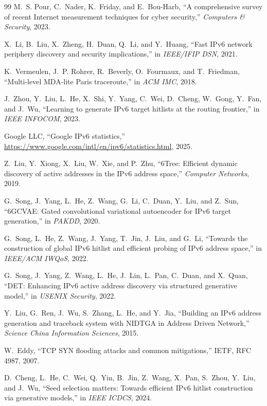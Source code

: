 \documentclass[conference]{IEEEtran}
\begin{document}
\begin{thebibliography}{99}
M.~S. Pour, C.~Nader, K.~Friday, and E.~Bou-Harb,
``A comprehensive survey of recent Internet measurement techniques
for cyber security,''
\emph{Computers \& Security}, 2023.

X.~Li, B.~Liu, X.~Zheng, H.~Duan, Q.~Li, and Y.~Huang,
``Fast IPv6 network periphery discovery and security implications,''
in \emph{IEEE/IFIP DSN}, 2021.

K.~Vermeulen, J.~P. Rohrer, R.~Beverly, O.~Fourmaux, and T.~Friedman,
``Multi-level MDA-lite Paris traceroute,''
in \emph{ACM IMC}, 2018.

J.~Zhou, Y.~Liu, L.~He, X.~Shi, Y.~Yang, C.~Wei, D.~Cheng, W.~Gong,
Y.~Fan, and J.~Wu,
``Learning to generate IPv6 target hitlists at the routing frontier,''
in \emph{IEEE INFOCOM}, 2023.

Google LLC,
``Google IPv6 statistics,''
\url{https://www.google.com/intl/en/ipv6/statistics.html}, 2025.

Z.~Liu, Y.~Xiong, X.~Liu, W.~Xie, and P.~Zhu,
``6Tree: Efficient dynamic discovery of active addresses in the IPv6
address space,''
\emph{Computer Networks}, 2019.

G.~Song, J.~Yang, L.~He, Z.~Wang, G.~Li, C.~Duan, Y.~Liu, and Z.~Sun,
``6GCVAE: Gated convolutional variational autoencoder for IPv6
target generation,''
in \emph{PAKDD}, 2020.

G.~Song, L.~He, Z.~Wang, J.~Yang, T.~Jin, J.~Liu, and G.~Li,
``Towards the construction of global IPv6 hitlist and efficient
probing of IPv6 address space,''
in \emph{IEEE/ACM IWQoS}, 2022.

G.~Song, J.~Yang, Z.~Wang, L.~He, J.~Lin, L.~Pan, C.~Duan, and X.~Quan,
``DET: Enhancing IPv6 active address discovery via structured
generative model,''
in \emph{USENIX Security}, 2022.

Y.~Liu, G.~Ren, J.~Wu, S.~Zhang, L.~He, and Y.~Jia,
``Building an IPv6 address generation and traceback system with NIDTGA
in Address Driven Network,''
\emph{Science China Information Sciences}, 2015.

W.~Eddy,
``TCP SYN flooding attacks and common mitigations,''
IETF, RFC 4987, 2007.

D.~Cheng, L.~He, C.~Wei, Q.~Yin, B.~Jin, Z.~Wang, X.~Pan, S.~Zhou,
Y.~Liu, and J.~Wu,
``Seed selection matters: Towards efficient IPv6 hitlist construction
via generative models,''
in \emph{IEEE ICDCS}, 2024.


\end{thebibliography}
\end{document}

